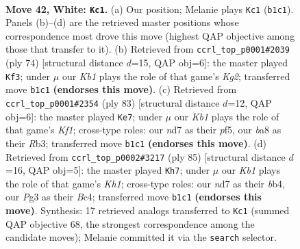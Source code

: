 \documentclass[11pt]{article}
\begin{document}
\clearpage

\begin{figure}[p]\centering
\begin{subfigure}{0.46\textwidth}\centering
\resizebox{\linewidth}{!}{%
\newchessgame
\chessboard[
  setfen={b6k/3n4/8/8/p2p2N1/P5P1/1PP5/1K6 w - - 2 42},
  showmover=false,
  pgfstyle=straightmove, color=movearrow, markmove={b1-c1}
]}
\caption{}
\end{subfigure}\hfill
\begin{subfigure}{0.46\textwidth}\centering
\resizebox{\linewidth}{!}{%
\newchessgame
\chessboard[
  setfen={3n2k1/8/1P4p1/7p/7P/6P1/5PK1/8 w - - 1 38},
  showmover=false,
  pgfstyle=straightmove, color=movearrow, markmove={g2-f3}
]}
\caption{}
\end{subfigure}
\\[4pt]
\begin{subfigure}{0.46\textwidth}\centering
\resizebox{\linewidth}{!}{%
\newchessgame
\chessboard[
  setfen={5k2/5pp1/7p/3pPP2/6P1/1r6/5K2/R7 b - - 1 42},
  showmover=false,
  pgfstyle=straightmove, color=movearrow, markmove={f8-e7}
]}
\caption{}
\end{subfigure}\hfill
\begin{subfigure}{0.46\textwidth}\centering
\resizebox{\linewidth}{!}{%
\newchessgame
\chessboard[
  setfen={7k/6p1/5p1p/8/1Bb1PNPP/1n6/5K2/8 b - - 0 43},
  showmover=false,
  pgfstyle=straightmove, color=movearrow, markmove={h8-h7}
]}
\caption{}
\end{subfigure}
\caption{\textbf{Move 42, White: \texttt{Kc1}.} (a) Our position; Melanie plays \texttt{Kc1} (\texttt{b1c1}). Panels (b)--(d) are the retrieved master positions whose correspondence most drove this move (highest QAP objective among those that transfer to it). (b) Retrieved from \texttt{ccrl\_top\_p0001\#2039} (ply 74) [structural distance $d$=15, QAP obj=6]: the master played \texttt{Kf3}; under $\mu$ our \emph{Kb1} plays the role of that game's \emph{Kg2}; transferred move \texttt{b1c1} \textbf{(endorses this move)}. (c) Retrieved from \texttt{ccrl\_top\_p0001\#2354} (ply 83) [structural distance $d$=12, QAP obj=6]: the master played \texttt{Ke7}; under $\mu$ our \emph{Kb1} plays the role of that game's \emph{Kf1}; cross-type roles: our \emph{n}d7 as their \emph{p}f5, our \emph{b}a8 as their \emph{R}b3; transferred move \texttt{b1c1} \textbf{(endorses this move)}. (d) Retrieved from \texttt{ccrl\_top\_p0002\#3217} (ply 85) [structural distance $d$=16, QAP obj=5]: the master played \texttt{Kh7}; under $\mu$ our \emph{Kb1} plays the role of that game's \emph{Kh1}; cross-type roles: our \emph{n}d7 as their \emph{b}b4, our \emph{P}g3 as their \emph{B}c4; transferred move \texttt{b1c1} \textbf{(endorses this move)}. Synthesis: 17 retrieved analogs transferred to \texttt{Kc1} (summed QAP objective 68, the strongest correspondence among the candidate moves); Melanie committed it via the \texttt{search} selector.}
\label{fig:thought-m82}
\end{figure}
\end{document}
